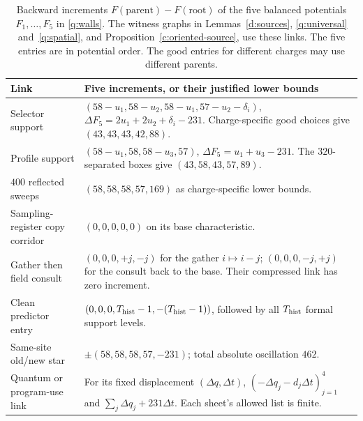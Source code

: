 \begin{table}[!htbp]
\centering\small
\renewcommand{\arraystretch}{1.1}
\caption{Backward increments \(F(\text{parent})-F(\text{root})\) of the five balanced potentials \(F_1,\ldots,F_5\) in \eqref{q:walls}. The witness graphs in Lemmas~\ref{d:sources}, \ref{q:universal} and~\ref{q:spatial}, and Proposition~\ref{c:oriented-source}, use these links. The five entries are in potential order. The good entries for different charges may use different parents.}
\label{q:links}
\begin{tabular}{>{\raggedright\arraybackslash}p{}>{\raggedright\arraybackslash}p{}}
\toprule
Link & Five increments, or their justified lower bounds\\
\midrule
Selector support &
\((58-u_1,58-u_2,58-u_1,57-u_2-\delta_i)\),\newline
\(\Delta F_5=2u_1+2u_2+\delta_i-231\).
Charge-specific good choices give \((43,43,43,42,88)\).\\\addlinespace[3pt]
Profile support &
\((58-u_1,58,58-u_3,57)\),\newline
\(\Delta F_5=u_1+u_3-231\).
\newline The \(320\)-separated boxes give \((43,58,43,57,89)\).\\\addlinespace[3pt]
\(400\) reflected sweeps &
\((58,58,58,57,169)\) as charge-specific lower bounds.\\\addlinespace[3pt]
Sampling-register copy corridor &
\((0,0,0,0,0)\) on its base characteristic.\\\addlinespace[3pt]
Gather then field consult &
\((0,0,0,+j,-j)\) for the gather \(i\mapsto i-j\);
\((0,0,0,-j,+j)\) for the consult back to the base.
Their compressed link has zero increment.\\\addlinespace[3pt]
Clean predictor entry &
\((0,0,0,T_{\rm hist}-1,-(T_{\rm hist}-1))\), followed by all \(T_{\rm hist}\) formal support levels.\\\addlinespace[3pt]
Same-site old/new star &
\(\pm(58,58,58,57,-231)\); total absolute oscillation \(462\).\\\addlinespace[3pt]
Quantum or program-use link &
For its fixed displacement \((\Delta q,\Delta t)\),
\((-\Delta q_j-d_j\Delta t)_{j=1}^4\) and
\(\sum_j\Delta q_j+231\Delta t\). Each sheet's allowed list is finite.\\
\bottomrule
\end{tabular}
\end{table}

